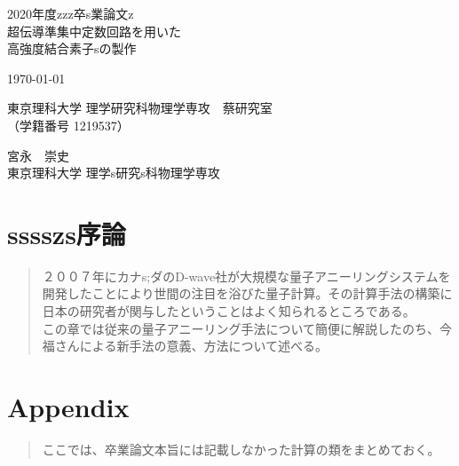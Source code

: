 \documentclass[]{jsbook}
\begin{document}
\begin{titlepage}
    \begin{center}
        {\Large 2020年度zzz卒s業論文z}\\
        \vspace{180truept}
        {\Huge 超伝導準集中定数回路を用いた\\
        \vspace{10truept}
        高強度結合素子sの製作}\\ 
        \vspace{70truept}

        {\Large \today}\\

        \vspace{70truept}

        {\Large 東京理科大学 理学研究科物理学専攻　蔡研究室\\
        （学籍番号 1219537）}\\

        \vspace{20truept}

        {\huge 宮永　崇史}\\

        \vspace{160truept}
        {\Large 東京理科大学 理学s研究s科物理学専攻}\\
    \end{center}
\end{titlepage}
%

\chapter{sssszs序論}
    \begin{abstract}
        ２００７年にカナs;ダのD-wave社が大規模な量子アニーリングシステムを開発したことにより世間の注目を浴びた量子計算。その計算手法の構築に日本の研究者が関与したということはよく知られるところである。\\
        この章では従来の量子アニーリング手法について簡便に解説したのち、今福さんによる新手法の意義、方法について述べる。\\

    \end{abstract}
    

\chapter{Appendix}
\begin{abstract}
    ここでは、卒業論文本旨には記載しなかった計算の類をまとめておく。

\end{abstract}
    
\end{document}
